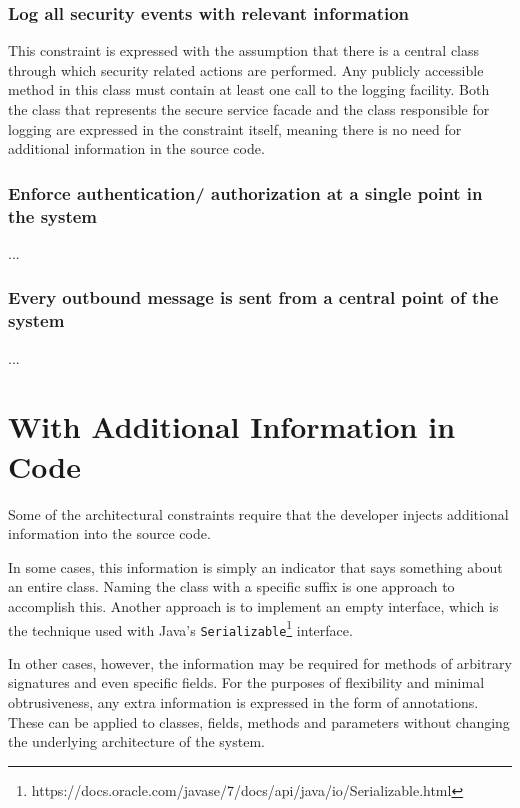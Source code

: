 
\subsubsection*{Log all security events with relevant information}
This constraint is expressed with the assumption that there is a central class through which security related actions are performed. Any publicly accessible method in this class must contain at least one call to the logging facility. Both the class that represents the secure service facade and the class responsible for logging are expressed in the constraint itself, meaning there is no need for additional information in the source code.

\subsubsection*{Enforce authentication/ authorization at a single point in the system}
...

\subsubsection*{Every outbound message is sent from a central point of the system}
...

\section{With Additional Information in Code}

Some of the architectural constraints require that the developer injects additional information into the source code.

In some cases, this information is simply an indicator that says something about an entire class. Naming the class with a specific suffix is one approach to accomplish this. Another approach is to implement an empty interface, which is the technique used with Java's \texttt{Serializable}\footnote{https://docs.oracle.com/javase/7/docs/api/java/io/Serializable.html} interface. 

In other cases, however, the information may be required for methods of arbitrary signatures and even specific fields. For the purposes of flexibility and minimal obtrusiveness, any extra information is expressed in the form of annotations. These can be applied to classes, fields, methods and parameters without changing the underlying architecture of the system.

